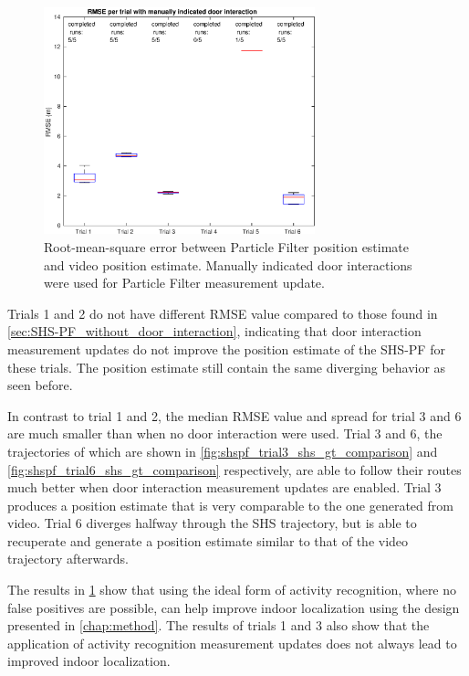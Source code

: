 \begin{figure}[H]
	\centering
	\includegraphics[width=0.7\textwidth]{images/20201201_1850_RMSE_per_trial_with_manually_indicated_door_interaction}
	\caption[Particle Filter position estimation performance with manual door interaction]{ Root-mean-square error between Particle Filter position estimate and video position estimate. Manually indicated door interactions were used for Particle Filter measurement update.}	
	\label{fig:pf_boxplot}
\end{figure}

Trials 1 and 2 do not have different RMSE value compared to those found in \cref{sec:SHS-PF_without_door_interaction}, indicating that door interaction measurement updates do not improve the position estimate of the SHS-PF for these trials. The position estimate still contain the same diverging behavior as seen before.\par 

In contrast to trial 1 and 2, the median RMSE value and spread for trial 3 and 6 are much smaller than when no door interaction were used.
Trial 3 and 6, the trajectories of which are shown in \cref{fig:shspf_trial3_shs_gt_comparison} and \cref{fig:shspf_trial6_shs_gt_comparison} respectively, are able to follow their routes much better when door interaction measurement updates are enabled. Trial 3 produces a position estimate that is very comparable to the one generated from video. Trial 6 diverges halfway through the SHS trajectory, but is able to recuperate and generate a position estimate similar to that of the video trajectory afterwards.\par 

The results in \cref{fig:pf_boxplot} show that using the ideal form of activity recognition, where no false positives are possible, can help improve indoor localization using the design presented in \cref{chap:method}. The results of trials 1 and 3 also show that the application of activity recognition measurement updates does not always lead to improved indoor localization.

